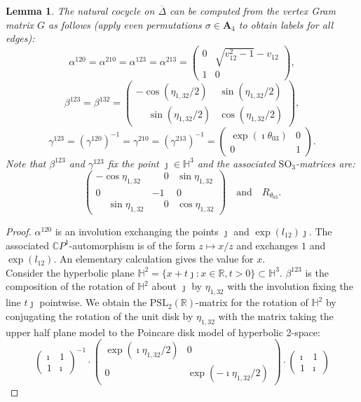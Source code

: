 \documentclass[utopia,fullpage]{nmd/article}
\newcommand\C{\mathbb C}
\newcommand\R{\mathbb R}
\renewcommand\H{\mathbb H}
\newtheorem{lemma}[theorem]{Lemma}
\newcommand\myPSL[2]{\mathrm{PSL}_{#1}(#2)}
\newcommand\mySO[1]{\mathrm{SO}_{#1}}
\newcommand\permA{\mathbf{A}}
\newcommand\myExp[1]{\exp(#1)}
\newcommand\myI{\imath}
\newcommand\myJ{\jmath}
\begin{document}
\begin{lemma}
The natural cocycle on $\overline{\Delta}$ can be computed from the vertex Gram matrix $G$ as follows (apply even permutations $\sigma\in \permA_4$ to obtain labels for all edges):
$$\alpha^{120}=\alpha^{210}=\alpha^{123}=\alpha^{213}=\left(\begin{array}{cc}0  & \sqrt{v_{12}^2-1} - v_{12}\\1 & 0 \end{array}\right),$$
$$\beta^{123}=\beta^{132}=\left(\begin{array}{cc}-\cos(\eta_{1,32}/2) & \sin(\eta_{1,32}/2)\\ \phantom{-}\sin(\eta_{1,32}/2) & \cos(\eta_{1,32}/2)\end{array}\right),$$
$$\gamma^{123}=\left(\gamma^{120}\right)^{-1}=\gamma^{210}=(\gamma^{213})^{-1}=\left(\begin{array}{cc}\myExp{\myI \theta_{03}} & 0 \\ 0 & 1\end{array}\right).$$
Note that $\beta^{123}$ and $\gamma^{123}$ fix the point $\myJ\in\H^3$ and the associated $\mySO{3}$-matrices are:
$$\left(\begin{array}{ccc}
-\cos\eta_{1,32} & \phantom{-}0 & \sin \eta_{1,32} \\
 0 & -1 & 0 \\
  \phantom{-}\sin\eta_{1,32} & \phantom{-}0 & \cos\eta_{1,32} \end{array}\right)\quad\mbox{and}\quad R_{\theta_{03}}.
$$
\label{lemma:coycleAssignment}
\end{lemma}

\begin{proof}
$\alpha^{120}$ is an involution exchanging the points $\myJ$ and $\myExp{l_{12}}\myJ$. The associated $\C P^1$-automorphism is of the form $z\mapsto x/z$ and exchanges $1$ and $\myExp{l_{12}}$. An elementary calculation gives the value for $x$.\\
Consider the hyperbolic plane $\H^2=\{x+t\myJ : x\in \R, t>0\}\subset \H^3$. $\beta^{123}$ is the composition of the rotation of $\H^2$ about $\myJ$ by $\eta_{1,32}$ with the involution fixing the line $t\myJ$ pointwise. We obtain the $\myPSL{2}{\R}$-matrix for the rotation of $\H^2$ by conjugating the rotation of the unit disk by $\eta_{1,32}$ with the matrix taking the upper half plane model to the Poincare disk model of hyperbolic 2-space:
$$\left(\begin{array}{cc}\myI & 1\\ 1 & \myI\end{array}\right)^{-1} \cdot \left(\begin{array}{cc} \myExp{\myI \eta_{1,32}/2} & 0 \\ 0 & \myExp{-\myI \eta_{1,32}/2}\end{array}\right)\cdot \left(\begin{array}{cc}\myI & 1\\ 1 & \myI\end{array}\right)$$
\end{proof}
\end{document}
